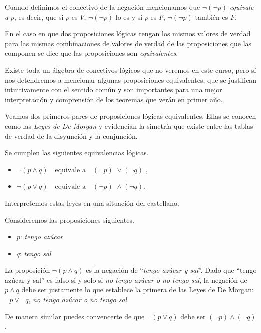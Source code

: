 Cuando definimos el conectivo de la negaci\'on mencionamos que 
$
\neg (
\neg p)$ {\em equivale a} $p$, es decir, que si $p$ es
$V$, $
\neg (
\neg p)$ lo es y si $p$ es $F$, $
\neg(
\neg p)$
tambi\'en es $F$.


En el caso en que dos proposiciones l\'ogicas 
tengan los mismos valores de verdad para 
las mismas combinaciones de valores de verdad de las proposiciones
que las componen se dice que las proposiciones son {\em equivalentes}.

Existe toda un álgebra de conectivos lógicos que 
no veremos en este curso, pero s\'i 
nos detendremos a mencionar algunas proposiciones equivalentes, que se 
justifican intuitivamente con el sentido común y son importantes
para una mejor interpretaci\'on y comprensi\'on de los teoremas 
que ver\'an en primer a\~no.

Veamos dos primeros pares de proposiciones l\'ogicas equivalentes.
Ellas se conocen como las {\em Leyes de De Morgan} y 
evidencian la simetría que 
existe entre las tablas de verdad de la disyunción y la conjunción.

\medskip

\begin{prop}
Se cumplen las siguientes equivalencias lógicas.
\begin{itemize}
\item
$
\neg (p\land q)\quad\textrm{equivale a}\quad (
\neg p)\,\, \lor (
\neg q)$
,
\item
$
\neg (p\lor q)\quad\textrm{equivale a}\quad (
\neg p) \,\,\land 
(
\neg q)$.
\end{itemize}
\end{prop}

Interpretemos estas leyes en una situación del castellano.

\medskip


\begin{ejemplo}
Consideremos las proposiciones siguientes.
\begin{itemize}
\item $p$: {\em tengo az\'ucar}
\item $q$: {\em tengo sal}
\end{itemize}

La proposici\'on $
\neg (p\wedge q)$ es la negaci\'on de 
``{\em tengo az\'ucar y sal}''. Dado que ``tengo az\'ucar y sal'' es
falso si y solo si 
{\em no tengo az\'ucar o no tengo sal}, la negaci\'on
de $p\wedge q$ debe ser justamente lo que establece
la primera de las Leyes de De Morgan:
$
\neg p \vee 
\neg q$, {\em no tengo az\'ucar o no tengo sal}.

De manera similar puedes convencerte de que 
$
\neg (p\vee q)$ debe ser $(
\neg p) \wedge (
\neg q)$. 
\end{ejemplo}

